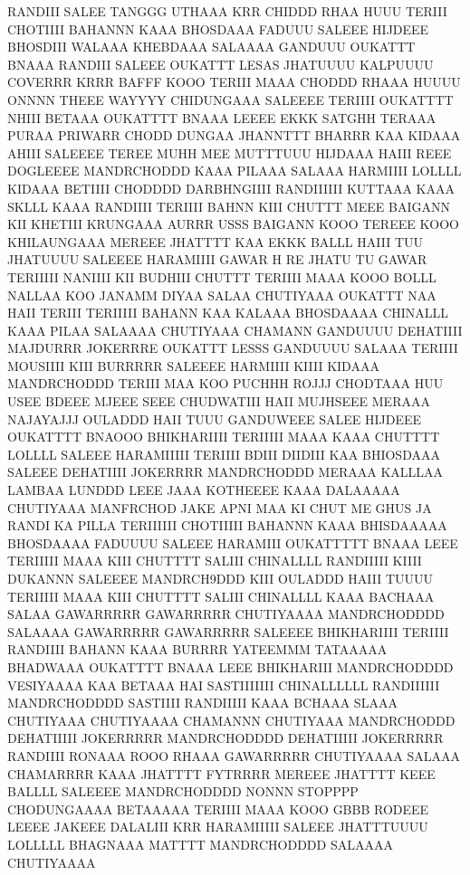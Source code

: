 RANDIII SALEE TANGGG UTHAAA KRR CHIDDD RHAA HUUU
TERIII CHOTIIII BAHANNN KAAA BHOSDAAA FADUUU
SALEEE HIJDEEE BHOSDIII WALAAA
KHEBDAAA SALAAAA GANDUUU OUKATTT BNAAA
RANDIII SALEEE OUKATTT LESAS JHATUUUU
KALPUUUU COVERRR KRRR BAFFF KOOO
TERIII MAAA CHODDD RHAAA HUUUU
ONNNN THEEE WAYYYY CHIDUNGAAA SALEEEE
TERIIII OUKATTTT NHIII BETAAA
OUKATTTT BNAAA LEEEE
EKKK SATGHH TERAAA PURAA PRIWARR CHODD DUNGAA
JHANNTTT BHARRR KAA KIDAAA AHIII
SALEEEE TEREE MUHH MEE MUTTTUUU
HIJDAAA HAIII REEE DOGLEEEE
MANDRCHODDD KAAA PILAAA
SALAAA HARMIIII LOLLLL KIDAAA
BETIIII CHODDDD DARBHNGIIII RANDIIIIII
KUTTAAA KAAA SKLLL KAAA RANDIIII
TERIIII BAHNN KIII CHUTTT MEEE BAIGANN KII KHETIII KRUNGAAA
AURRR USSS BAIGANN KOOO TEREEE KOOO KHILAUNGAAA
MEREEE JHATTTT KAA EKKK BALLL HAIII TUU
JHATUUUU SALEEEE HARAMIIII
GAWAR H RE JHATU TU GAWAR
TERIIIII NANIIII KII BUDHIII CHUTTT
TERIIII MAAA KOOO BOLLL NALLAA KOO JANAMM DIYAA
SALAA CHUTIYAAA OUKATTT NAA HAII TERIII
TERIIIII BAHANN KAA KALAAA BHOSDAAAA
CHINALLL KAAA PILAA SALAAAA
CHUTIYAAA CHAMANN GANDUUUU
DEHATIIII MAJDURRR JOKERRRE
OUKATTT LESSS GANDUUUU SALAAA
TERIIII MOUSIIII KIII BURRRRR SALEEEE
HARMIIII KIIII KIDAAA MANDRCHODDD
TERIII MAA KOO PUCHHH ROJJJ CHODTAAA HUU USEE
BDEEE MJEEE SEEE CHUDWATIII HAII MUJHSEEE
MERAAA NAJAYAJJJ OULADDD HAII TUUU
GANDUWEEE SALEE HIJDEEE
OUKATTTT BNAOOO BHIKHARIIII
TERIIIII MAAA KAAA CHUTTTT
LOLLLL SALEEE HARAMIIIII
TERIIII BDIII DIIDIII KAA BHIOSDAAA
SALEEE DEHATIIII JOKERRRR MANDRCHODDD
MERAAA KALLLAA LAMBAA LUNDDD LEEE JAAA
KOTHEEEE KAAA DALAAAAA CHUTIYAAA
MANFRCHOD JAKE APNI MAA KI CHUT ME GHUS JA RANDI KA PILLA
TERIIIIII CHOTIIIII BAHANNN KAAA BHISDAAAAA
BHOSDAAAA FADUUUU SALEEE HARAMIII OUKATTTTT BNAAA LEEE
TERIIIII MAAA KIII CHUTTTT SALIII CHINALLLL
RANDIIIII KIIII DUKANNN SALEEEE
MANDRCH9DDD KIII OULADDD HAIII TUUUU
TERIIIII MAAA KIII CHUTTTT SALIII
CHINALLLL KAAA BACHAAA SALAA GAWARRRRR
GAWARRRRR CHUTIYAAAA MANDRCHODDDD SALAAAA GAWARRRRR
GAWARRRRR SALEEEE BHIKHARIIII
TERIIII RANDIIII BAHANN KAAA BURRRR
YATEEMMM TATAAAAA BHADWAAA 
OUKATTTT BNAAA LEEE BHIKHARIII MANDRCHODDDD
VESIYAAAA KAA BETAAA HAI
SASTIIIIIII CHINALLLLLL RANDIIIIII MANDRCHODDDD
SASTIIII RANDIIIII KAAA BCHAAA SLAAA CHUTIYAAA
CHUTIYAAAA CHAMANNN CHUTIYAAA MANDRCHODDD
DEHATIIIII JOKERRRRR MANDRCHODDDD
DEHATIIIII JOKERRRRR RANDIIII RONAAA ROOO RHAAA
GAWARRRRR CHUTIYAAAA SALAAA CHAMARRRR KAAA JHATTTT
FYTRRRR MEREEE JHATTTT KEEE BALLLL SALEEEE MANDRCHODDDD
NONNN STOPPPP CHODUNGAAAA BETAAAAA TERIIII MAAA KOOO
GBBB RODEEE LEEEE JAKEEE DALALIII KRR
HARAMIIIII SALEEE JHATTTUUUU LOLLLLL
BHAGNAAA MATTTT MANDRCHODDDD SALAAAA CHUTIYAAAA
